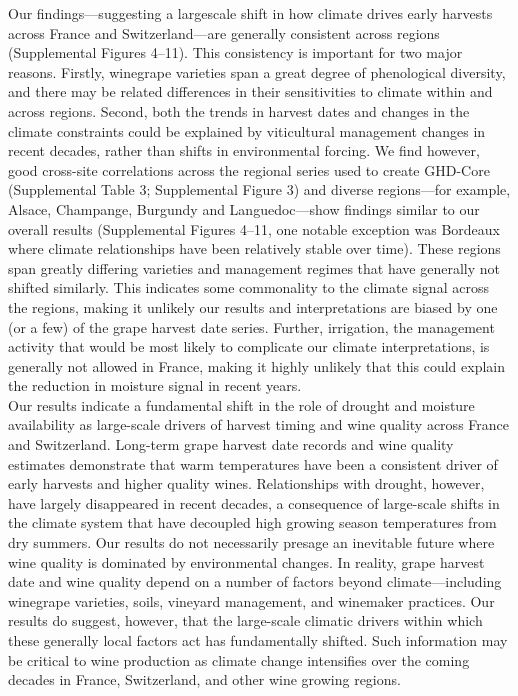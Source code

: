 \documentclass[final]{nature}
\begin{document}
\indent Our findings---suggesting a largescale shift in how climate drives early harvests across France and Switzerland---are generally consistent across regions (Supplemental Figures 4--11).  This consistency is important for two major reasons. Firstly, winegrape varieties span a great degree of phenological diversity, and there may be related differences in their sensitivities to climate within and across regions\cite{Parker2013}. Second, both the trends in harvest dates and changes in the climate constraints could be explained by viticultural management changes in recent decades, rather than shifts in environmental forcing. We find however, good cross-site correlations across the regional series used to create GHD-Core (Supplemental Table 3; Supplemental Figure 3) and diverse regions---for example, Alsace, Champange, Burgundy and Languedoc---show findings similar to our overall results (Supplemental Figures 4--11, one notable exception was Bordeaux where climate relationships have been relatively stable over time). These regions span greatly differing varieties and management regimes that have generally not shifted similarly. This indicates some commonality to the climate signal across the regions, making it unlikely our results and interpretations are biased by one (or a few) of the grape harvest date series. Further, irrigation, the management activity that would be most likely to complicate our climate interpretations, is generally not allowed in France, making it highly unlikely that this could explain the reduction in moisture signal in recent years.\\
\indent Our results indicate a fundamental shift in the role of drought and moisture availability as large-scale drivers of harvest timing and wine quality across France and Switzerland. Long-term grape harvest date records and wine quality estimates demonstrate that warm temperatures have been a consistent driver of early harvests and higher quality wines. Relationships with drought, however, have largely disappeared in recent decades, a consequence of large-scale shifts in the climate system that have decoupled high growing season temperatures from dry summers. Our results do not necessarily presage an inevitable future where wine quality is dominated by environmental changes. In reality, grape harvest date and wine quality depend on a number of factors beyond climate---including winegrape varieties, soils, vineyard management, and winemaker practices\cite{Jackson1993,Leeuwen2013}. Our results do suggest, however, that the large-scale climatic drivers within which these generally local factors act has fundamentally shifted. Such information may be critical to wine production as climate change intensifies over the coming decades in France, Switzerland, and other wine growing regions.
\end{document}
